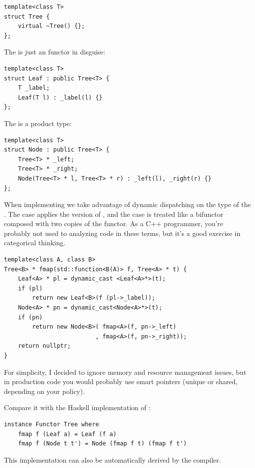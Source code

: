 \begin{Verbatim}[commandchars=\\\{\}]
template<class T>
struct Tree { 
    virtual ~Tree() {};
};
\end{Verbatim}
The  is just an  functor in disguise:

\begin{Verbatim}[commandchars=\\\{\}]
template<class T>
struct Leaf : public Tree<T> {
    T _label;
    Leaf(T l) : _label(l) {}
};
\end{Verbatim}
The  is a product type:

\begin{Verbatim}[commandchars=\\\{\}]
template<class T>
struct Node : public Tree<T> {
    Tree<T> * _left;
    Tree<T> * _right;
    Node(Tree<T> * l, Tree<T> * r) : _left(l), _right(r) {}
};
\end{Verbatim}
When implementing  we take advantage of dynamic dispatching
on the type of the . The  case applies the
 version of , and the  case
is treated like a bifunctor composed with two copies of the
 functor. As a C++ programmer, you're probably not used to
analyzing code in these terms, but it's a good exercise in categorical
thinking.

\begin{Verbatim}[commandchars=\\\{\}]
template<class A, class B>
Tree<B> * fmap(std::function<B(A)> f, Tree<A> * t) {
    Leaf<A> * pl = dynamic_cast <Leaf<A>*>(t);
    if (pl)
        return new Leaf<B>(f (pl->_label));
    Node<A> * pn = dynamic_cast<Node<A>*>(t);
    if (pn)
        return new Node<B>( fmap<A>(f, pn->_left) 
                          , fmap<A>(f, pn->_right));
    return nullptr;
}
\end{Verbatim}
For simplicity, I decided to ignore memory and resource management
issues, but in production code you would probably use smart pointers
(unique or shared, depending on your policy).

Compare it with the Haskell implementation of :

\begin{Verbatim}[commandchars=\\\{\}]
instance Functor Tree where
    fmap f (Leaf a) = Leaf (f a)
    fmap f (Node t t') = Node (fmap f t) (fmap f t')
\end{Verbatim}
This implementation can also be automatically derived by the compiler.

